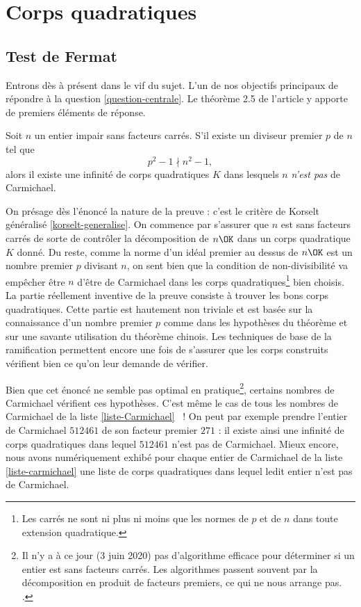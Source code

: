 \section{Corps quadratiques}

\subsection{Test de Fermat}

Entrons dès à présent dans le vif du sujet. L'un de nos objectifs principaux de répondre à la question \ref{question-centrale}. Le théorème 2.5 de l'article y apporte de premiers éléments de réponse.

\begin{theoreme}\label{theoreme-2.5}
	Soit $n$ un entier impair sans facteurs carrés. S'il existe un diviseur premier $p$ de $n$ tel que $$p^2 - 1 \nmid n^2 - 1,$$ alors il existe une infinité de corps quadratiques $K$ dans lesquels $n$ \emph{n'est pas} de Carmichael.
\end{theoreme}

\begin{MotSurPreuve}
	On présage dès l'énoncé la nature de la preuve : c'est le critère de Korselt généralisé \ref{korselt-generalise}. On commence par s'assurer que $n$ est sans facteurs carrés de sorte de contrôler la décomposition de $n\OK$ dans un corps quadratique $K$ donné. Du reste, comme la norme d'un idéal premier au dessus de $n\OK$ est un nombre premier $p$ divisant $n$, on sent bien que la condition de non-divisibilité va empêcher être $n$ d'être de Carmichael dans les corps quadratiques\footnote{Les carrés ne sont ni plus ni moins que les normes de $p$ et de $n$ dans toute extension quadratique.} bien choisis. La partie réellement inventive de la preuve consiste à trouver les bons corps quadratiques. Cette partie est hautement non triviale et est basée sur la connaissance d'un nombre premier $p$ comme dans les hypothèses du théorème et sur une savante utilisation du théorème chinois. Les techniques de base de la ramification permettent encore une fois de s'assurer que les corps construits vérifient bien ce qu'on leur demande de vérifier. \\
\end{MotSurPreuve}

Bien que cet énoncé ne semble pas optimal en pratique\footnote{Il n'y a à ce jour (3 juin 2020) pas d'algorithme efficace pour déterminer si un entier est sans facteurs carrés. Les algorithmes passent souvent par la décomposition en produit de facteurs premiers, ce qui ne nous arrange pas. .}, certains nombres de Carmichael vérifient ces hypothèses. C'est même le cas de tous les nombres de Carmichael de la liste \ref{liste-Carmichael} ~! On peut par exemple prendre l'entier de Carmichael $512461$ de son facteur premier $271$ : il existe ainsi une infinité de corps quadratiques dans lequel $512461$ n'est pas de Carmichael. Mieux encore, nous avons numériquement exhibé pour chaque entier de Carmichael de la liste \ref{liste-carmichael} une liste de corps quadratiques dans lequel ledit entier n'est pas de Carmichael.  \\

